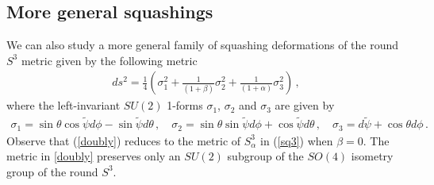 \documentclass[12pt]{article}
\numberwithin{equation}{section}
\newcommand{\req}[1]{(\ref{#1})} %
\begin{document}
\subsection{More general squashings}

We can also study a more general family of squashing deformations of the round $S^3$ metric given by the following metric
%
\begin{align}\label{doubly}
ds^2= \frac14 \left( \sigma^2_1 + \frac{1}{(1+\beta)}\sigma^2_2 +  \frac{1}{(1+\alpha)}\sigma^2_3 \right) \, ,
\end{align}
%
where the left-invariant $SU(2)$ 1-forms $\sigma_1$, $\sigma_2$ and $\sigma_3$ are given by
%
\begin{align}
\sigma_1=  \sin\theta \cos \tilde{\psi} d\phi - \sin\tilde{\psi} d\theta\, , \quad 
\sigma_2= \sin\theta \sin \tilde{\psi} d\phi + \cos\tilde{\psi} d\theta\, , \quad
\sigma_3= d\tilde{\psi}+\cos\theta d\phi\, .
\end{align}
%
Observe that \req{doubly} reduces to the metric of $S^3_{\alpha}$ in \req{sq3} when $\beta=0$. The metric in \eqref{doubly} preserves only an $SU(2)$ subgroup of the $SO(4)$ isometry group of the round $S^3$.
\end{document}
